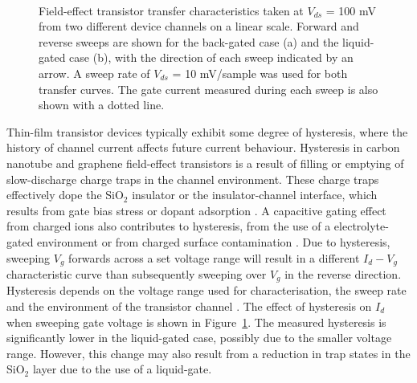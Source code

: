 \documentclass[
  a4paper,
]{scrbook}
\begin{document}
\begin{figure}
\begin{minipage}[t]{0.45\linewidth}
{{}

}

\end{minipage}%
%
\begin{minipage}[t]{0.01\linewidth}

{\centering 

~

}

\end{minipage}%

\caption{\label{fig-gating-hysteresis}Field-effect transistor transfer
characteristics taken at \(V_{ds}\) = 100 mV from two different device
channels on a linear scale. Forward and reverse sweeps are shown for the
back-gated case (a) and the liquid-gated case (b), with the direction of
each sweep indicated by an arrow. A sweep rate of \(V_{ds}\) = 10
mV/sample was used for both transfer curves. The gate current measured
during each sweep is also shown with a dotted line.}

\end{figure}

Thin-film transistor devices typically exhibit some degree of
hysteresis, where the history of channel current affects future current
behaviour. Hysteresis in carbon nanotube and graphene field-effect
transistors is a result of filling or emptying of slow-discharge charge
traps in the channel environment. These charge traps effectively dope
the SiO\(_2\) insulator or the insulator-channel interface, which
results from gate bias stress or dopant adsorption
\autocite{McEuen2002,Kim2003,Wang2010,Bartolomeo2011,Bargaoui2018,Peng2018}.
A capacitive gating effect from charged ions also contributes to
hysteresis, from the use of a electrolyte-gated environment or from
charged surface contamination \autocite{Wang2010,Yao2021}. Due to
hysteresis, sweeping \(V_g\) forwards across a set voltage range will
result in a different \(I_d - V_g\) characteristic curve than
subsequently sweeping over \(V_g\) in the reverse direction. Hysteresis
depends on the voltage range used for characterisation, the sweep rate
and the environment of the transistor channel
\autocite{Kim2003,Wang2010}. The effect of hysteresis on \(I_d\) when
sweeping gate voltage is shown in Figure~\ref{fig-gating-hysteresis}.
The measured hysteresis is significantly lower in the liquid-gated case,
possibly due to the smaller voltage range. However, this change may also
result from a reduction in trap states in the SiO\(_2\) layer due to the
use of a liquid-gate.
\end{document}
